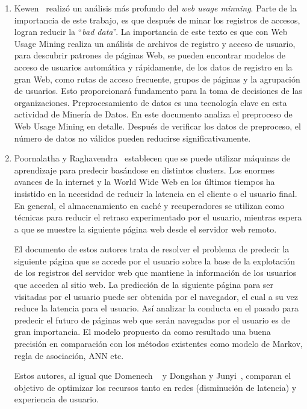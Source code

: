 \begin{enumerate}
  \item Kewen~\cite{kewen2012} realizó un análisis más profundo del \emph{web usage minning}.
  Parte de la importancia de este trabajo, es que después de minar los registros de accesos, logran reducir la ``\emph{bad data}''.
  La importancia de este texto es que con Web Usage Mining realiza un  análisis de archivos de registro y acceso de usuario, para  descubrir patrones de páginas Web, se pueden encontrar modelos de acceso de usuarios automática y rápidamente, de los datos de registro en la gran Web, como rutas de acceso frecuente,  grupos de páginas y la agrupación de usuarios.
  Esto proporcionará fundamento para la toma de decisiones de las organizaciones. Preprocesamiento de datos es una tecnología clave en esta actividad de Minería de Datos. En este documento analiza el preproceso de Web Usage Mining en detalle. Después de verificar los datos de preproceso, el número de datos no válidos pueden reducirse significativamente.
  
  
  \item Poornalatha y Raghavendra~\cite{Poornalatha2012} establecen que se puede utilizar máquinas de aprendizaje para predecir basándose en distintos  clusters. 
  Los enormes avances de la internet y la World Wide Web en los últimos tiempos ha insistido en la necesidad de reducir la latencia en el cliente o el usuario final. En general, el almacenamiento en caché y recuperadores se utilizan como técnicas para reducir el retraso experimentado por el usuario, mientras espera a que se muestre la siguiente página web desde el servidor web remoto. 
  
  El documento de estos autores trata de resolver el problema de predecir la siguiente página que se accede por el usuario sobre la base de la explotación de los registros del servidor web que mantiene la información de los usuarios que acceden al sitio web. La predicción de la siguiente página para ser visitadas por el usuario puede ser obtenida por el navegador, el cual a su vez reduce la latencia para el usuario. Así analizar la conducta en el pasado para predecir el futuro de páginas web que serán navegadas por el usuario es de gran importancia. El modelo propuesto da como resultado una buena precisión en comparación con los métodos existentes como modelo de Markov, regla de asociación, ANN etc.
  
  
  Estos autores, al igual que Domenech \etal~\cite{Domenech2006} y Dongshan y Junyi~\cite{Dongshan2002}, comparan el objetivo de optimizar los recursos tanto en redes (disminución de latencia) y experiencia de usuario.


\end{enumerate}
